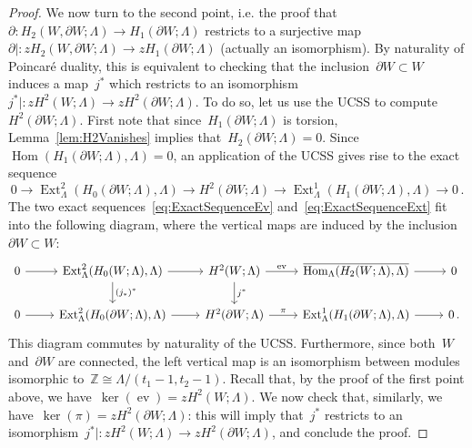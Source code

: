 \documentclass[10.9pt,a4paper]{amsart}
\theoremstyle{definition}
\theoremstyle{remark}
\newcommand{\Z}{\mathbb{Z}}
\newcommand{\ev}{\operatorname{ev}}
\newcommand{\Ext}{\operatorname{Ext}}
\newcommand{\Hom}{\operatorname{Hom}}
\begin{document}
\begin{proof}
We now turn to the second point, i.e. the proof that~$\partial\colon H_2(W,\partial W; \Lambda)\to H_1(\partial W; \Lambda)$ restricts to a surjective map~$\partial|\colon zH_2(W,\partial W; \Lambda)\to zH_1(\partial W; \Lambda)$ (actually an isomorphism). By naturality of Poincar\'e duality, this is equivalent to checking that the inclusion~$\partial W\subset W$
induces a map~$j^*$ which restricts to an isomorphism~$j^*|\colon zH^2(W;\Lambda)\to zH^2(\partial W;\Lambda)$.
To do so, let us use the UCSS to compute~$H^2(\partial W;\Lambda)$.
First note that since~$H_1(\partial W;\Lambda)$ is torsion, Lemma~\ref{lem:H2Vanishes} implies that~$H_2(\partial W;\Lambda)=0$.
Since $\Hom(H_1(\partial W;\Lambda),\Lambda)=0$, an application of the UCSS gives rise to the exact sequence
\begin{equation}
\label{eq:ExactSequenceExt}
0 \to  \Ext_\Lambda^2(H_0(\partial W;\Lambda),\Lambda) \to H^2(\partial W;\Lambda) \to \Ext_\Lambda^1(H_1(\partial W;\Lambda),\Lambda)\to 0\,.
\end{equation}
The two exact sequences~\eqref{eq:ExactSequenceEv} and~\eqref{eq:ExactSequenceExt} fit into the following diagram,
where the vertical maps are induced by the inclusion~$\partial W\subset W$:
\[
\begin{tikzcd}
0\arrow[r]&\Ext_\Lambda^2(H_0(W;\Lambda),\Lambda)\arrow[r]\arrow[d,"(j_*)^*"]& H^2(W;\Lambda)\arrow[r,"\ev"]\arrow[d,"j^*"]& \overline{\Hom_\Lambda(H_2(W; \Lambda),\Lambda)}\arrow[r]&  0\\
0\arrow[r]&\Ext_\Lambda^2(H_0(\partial W;\Lambda),\Lambda)\arrow[r]& H^2(\partial W;\Lambda)\arrow[r,"\pi"]& \Ext_\Lambda^1(H_1(\partial W;\Lambda),\Lambda)\arrow[r]&  0\,.
\end{tikzcd}
\]
This diagram commutes by naturality of the UCSS.
Furthermore, since both~$W$ and~$\partial W$ are connected, the left vertical map is an isomorphism between modules isomorphic to~$\Z\cong\Lambda/(t_1-1,t_2-1)$.
Recall that, by the proof of the first point above, we have~$\ker(\ev)=zH^2(W;\Lambda)$. We now check that,
similarly, we have~$\ker(\pi)=zH^2(\partial W;\Lambda)$: this will imply that~$j^*$ restricts to an isomorphism~$j^*|\colon zH^2(W;\Lambda)\to zH^2(\partial W;\Lambda)$, and conclude the proof.

\end{proof}
\end{document}
